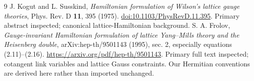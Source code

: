 \documentclass[11pt,a4paper]{article}
\begin{document}
\begin{thebibliography}{9}
 J. Kogut and L. Susskind, \emph{Hamiltonian formulation of Wilson's lattice gauge theories}, Phys. Rev. D \textbf{11}, 395 (1975). \href{https://doi.org/10.1103/PhysRevD.11.395}{doi:10.1103/PhysRevD.11.395}. Primary abstract inspected; canonical lattice-Hamiltonian background.
 S. A. Frolov, \emph{Gauge-invariant Hamiltonian formulation of lattice Yang--Mills theory and the Heisenberg double}, arXiv:hep-th/9501143 (1995), sec. 2, especially equations (2.11)--(2.16). \url{https://arxiv.org/pdf/hep-th/9501143}. Primary full text inspected; cotangent link variables and lattice Gauss constraints. Our Hermitian conventions are derived here rather than imported unchanged.
\end{thebibliography}
\end{document}
